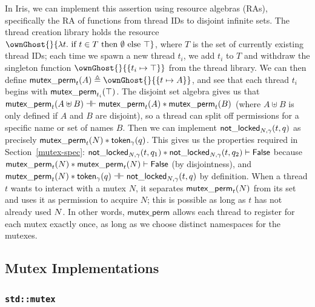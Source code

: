 In Iris, we can implement this assertion using resource algebras (RAs), specifically the RA of functions from thread IDs to disjoint infinite sets. The thread creation library holds the resource $\ownGhost{}{\lambda t.\ \text{if } t \in T \text{ then } \emptyset \text{ else } \top}$, where $T$ is the set of currently existing thread IDs; each time we spawn a new thread $t_i$, we add $t_i$ to $T$ and withdraw the singleton function $\ownGhost{}{\{ t_i \mapsto \top \}}$ from the thread library. We can then define $\mutexperm{t}{A} \triangleq \ownGhost{}{\{ t \mapsto A \}}$, and see that each thread $t_i$ begins with $\mathsf{mutex\_perm}_{t_i}(\top)$. The disjoint set algebra gives us that $\mathsf{mutex\_perm}_{t}(A \uplus B) \dashv\vdash \mathsf{mutex\_perm}_{t}(A) \ast \mathsf{mutex\_perm}_{t}(B)$ (where $A \uplus B$ is only defined if $A$ and $B$ are disjoint), so a thread can split off permissions for a specific name or set of names $B$. Then we can implement $\mathsf{not\_locked}_{N, \gamma}(t, q)$ as precisely $\mathsf{mutex\_perm}_{t}(N) \ast \mathsf{token}_{\gamma}(q)$. This gives us the properties required in Section~\ref{mutex-spec}: $\mathsf{not\_locked}_{N, \gamma}(t, q_1) \ast \mathsf{not\_locked}_{N, \gamma}(t, q_2) \vdash \mathsf{False}$ because $\mathsf{mutex\_perm}_{t}(N) \ast \mathsf{mutex\_perm}_{t}(N) \vdash \mathsf{False}$ (by disjointness), and $\mathsf{mutex\_perm}_{t}(N) \ast \mathsf{token}_{\gamma}(q) \dashv \vdash \mathsf{not\_locked}_{N, \gamma}(t, q)$ by definition.
When a thread $t$ wants to interact with a mutex $N$, it separates $\mathsf{mutex\_perm}_{t}(N)$ from its set and uses it as permission to acquire $N$; this is possible as long as $t$ has not already used $N$. In other words, $\mathsf{mutex\_perm}$ allows each thread to register for each mutex exactly once, as long as we choose distinct namespaces for the mutexes.

\subsection{Mutex Implementations}
\subsubsection{\lstinline{std::mutex}}

\newcommand{\giventoken}[2]{\ensuremath{\mathsf{given\_token}_{#1}(#2)}}

